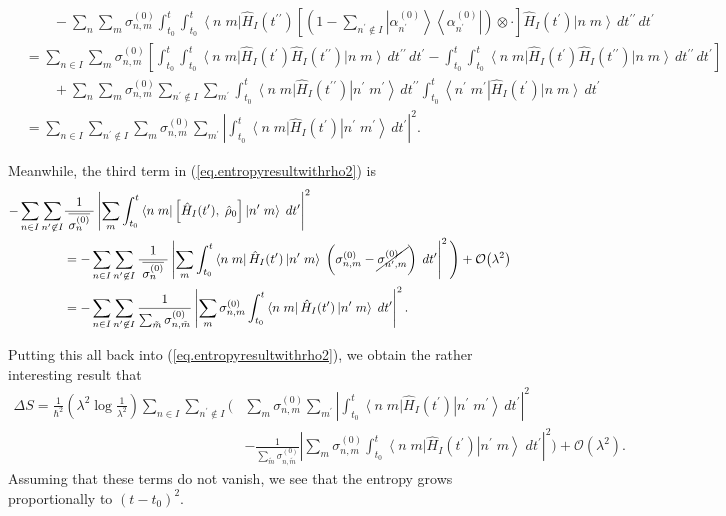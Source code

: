 \documentclass[11pt]{article}
\newcommand{\Od}[1]{\mathcal{O}{\left(#1\right)}}
\newcommand{\bra}[1]{\left\langle#1\right|}
\newcommand{\ket}[1]{\left|#1\right\rangle}
\newcommand{\op}[1]{\hat{#1}}
\newcommand{\bket}[2]{\ket{#1\;#2}}
\newcommand{\bbra}[2]{\bra{#1\;#2}}
\theoremstyle{theorem}
\theoremstyle{remark}
\theoremstyle{step}
\theoremstyle{gap}
\begin{document}
\begin{align*}
&\hspace{2em}-\sum_{n} \sum_{m} \sigma_{n,m}^{(0)}\int_{t_0}^t \int_{t_0}^{t} \bbra{n}{m} \op{H}_I (t^{\prime\prime})\left[\left(1-\sum_{n^\prime\not\in I} \ket{\alpha_{n^\prime}^{(0)}}\bra{\alpha_{n^\prime}^{(0)}}\right)\otimes\cdot\right]\op{H}_I (t^\prime) \bket{n}{m}\,dt^{\prime\prime}\,dt^\prime \\
&= \sum_{n \in I}\sum_m \sigma_{n,m}^{(0)} \left[\int_{t_0}^t \int_{t_0}^{t} \bbra{n}{m}\op{H}_I (t^\prime) \op{H}_I(t^{\prime\prime}) \bket{n}{m}\,dt^{\prime\prime}\,dt^\prime - \int_{t_0}^t \int_{t_0}^{t} \bbra{n}{m}\op{H}_I (t^\prime) \op{H}_I(t^{\prime\prime}) \bket{n}{m}\,dt^{\prime\prime}\,dt^\prime\right]\\
&\hspace{2em}+ \sum_{n} \sum_m \sigma_{n,m}^{(0)} \sum_{n^\prime \not\in I} \sum_{m^\prime} \int_{t_0}^t \bbra{n}{m} \op{H}_I (t^{\prime\prime})\bket{n^\prime}{m^\prime} \,dt^{\prime\prime}\int_{t_0}^t \bbra{n^\prime}{m^\prime} \op{H}_I (t^{\prime})\bket{n}{m}\,dt^\prime \\
&=\sum_{n \in I} \sum_{n^\prime \not\in I} \sum_m \sigma_{n,m}^{(0)} 
 \sum_{m^\prime} \left|\int_{t_0}^t \bbra{n}{m} \op{H}_I (t^{\prime})\bket{n^\prime}{m^\prime} \,dt^{\prime}\right|^2.
\end{align*}

Meanwhile, the third term in (\ref{eq.entropyresultwithrho2}) is
\begin{align*}
-\sum_{n \in I}\sum_{n^\prime \not \in I} &\frac{1}{\;\overline{\sigma_n^{(0)}}\;} \left|\sum_m\int_{t_0}^t \bbra{n}{m} \left[\op{H}_I(t^\prime),\; \op{\rho}_0 \right] \bket{n^\prime}{m}\;dt^\prime \right|^2 \\
&= -\sum_{n \in I}\sum_{n^\prime \not \in I} \frac{1}{\;\overline{\sigma_n^{(0)}}\;} \left|\sum_m\int_{t_0}^t \bbra{n}{m} \op{H}_I(t^\prime) 
 \bket{n^\prime}{m}\;\left({\sigma_{n,m}^{(0)}} - \cancel{{\sigma_{n^\prime,m}^{(0)}}}\right)\;dt^\prime \right|^2\Bigg) + \Od{\lambda^2} \\
 &= -\sum_{n \in I}\sum_{n^\prime \not \in I} \frac{1}{\sum_{\tilde{m}} \sigma_{n,\tilde{m}}^{(0)}} \left|\sum_m{\sigma_{n,m}^{(0)}}\int_{t_0}^t \bbra{n}{m} \op{H}_I(t^\prime) 
 \bket{n^\prime}{m}\;dt^\prime \right|^2.
\end{align*}

Putting this all back into (\ref{eq.entropyresultwithrho2}), we obtain the rather interesting result that
\begin{align}\label{eq.Sredresult.separable}
\Delta S =\frac{1}{\hbar^2}\left(\lambda^2 \log\frac{1}{\lambda^2}\right) \sum_{n\in I}\sum_{n^\prime \not\in I} \Bigg(& \sum_m \sigma_{n,m}^{(0)} \sum_{m^\prime} \left|\int_{t_0}^t \bbra{n}{m}\op{H}_I (t^{\prime})\bket{n^\prime}{m^\prime} \,dt^{\prime}\right|^2 \\
&- \frac{1}{\sum_{\tilde{m}} \sigma_{n,\tilde{m}}^{(0)}} \left|\sum_m{\sigma_{n,m}^{(0)}}\int_{t_0}^t \bbra{n}{m} \op{H}_I(t^\prime) 
 \bket{n^\prime}{m}\;dt^\prime \right|^2\Bigg) + \Od{\lambda^2}. \nonumber
\end{align}
Assuming that these terms do not vanish, we see that the entropy grows proportionally to \(\left(t-t_0\right)^2\).
\end{document}
